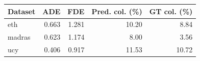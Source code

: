 \begin{tabular}{lrrrr}
Dataset & ADE & FDE & Pred. col. (\%) & GT col. (\%) \\
\hline
eth & 0.663 & 1.281 & 10.20 & 8.84 \\
madras & 0.623 & 1.174 & 8.00 & 3.56 \\
ucy & 0.406 & 0.917 & 11.53 & 10.72 \\
\end{tabular}
